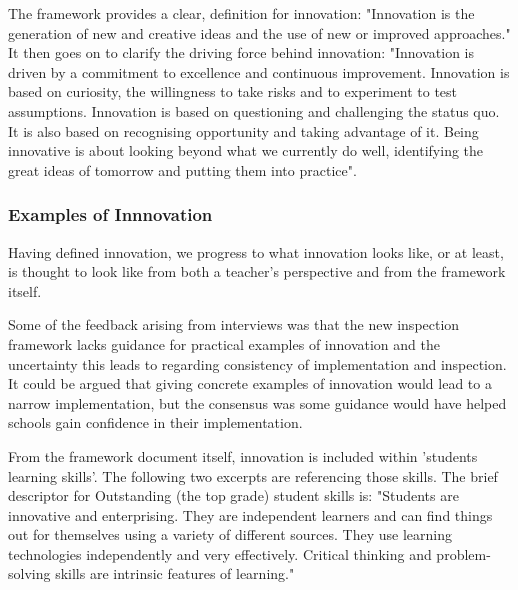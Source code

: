 The framework provides a clear, definition for innovation: "Innovation is the generation of new and creative ideas and the use of new or improved approaches." \cite[p. 12]{ADEC2016} It then goes on to clarify the driving force behind innovation: "Innovation is driven by a commitment to excellence and continuous improvement. Innovation is based on curiosity, the willingness to take risks and to experiment to test assumptions. Innovation is based on questioning and challenging the status quo. It is also based on recognising opportunity and taking advantage of it. Being innovative is about looking beyond what we currently do well, identifying the great ideas of tomorrow and putting them into practice".

\subsubsection{Examples of Innnovation}

Having defined innovation, we progress to what innovation looks like, or at least, is thought to look like from both a teacher’s perspective and from the framework itself.

Some of the feedback arising from interviews was that the new inspection framework lacks guidance for practical examples of innovation and the uncertainty this leads to regarding consistency of implementation and inspection. It could be argued that giving concrete examples of innovation would lead to a narrow implementation, but the consensus was some guidance would have helped schools gain confidence in their implementation.

From the framework document itself, innovation is included within 'students learning skills'. The following two excerpts are referencing those skills. The brief descriptor for Outstanding (the top grade) student skills is: "Students are innovative and enterprising. They are independent learners and can find things out for themselves using a variety of different sources. They use learning technologies independently and very effectively. Critical thinking and problem- solving skills are intrinsic features of learning." \cite[p. 33]{ADEC2016}

